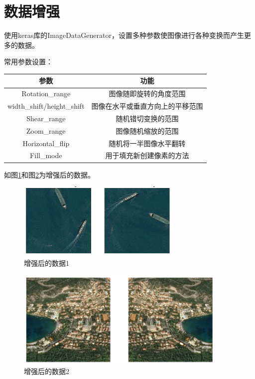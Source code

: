 \section{数据增强}

使用keras库的ImageDataGenerator，设置多种参数使图像进行各种变换而产生更多的数据。

常用参数设置：

\begin{longtable}[]{@{}cc@{}}
\toprule
参数 & 功能\tabularnewline
\midrule
\endhead
Rotation\_range & 图像随即旋转的角度范围\tabularnewline
width\_shift/height\_shift &
图像在水平或垂直方向上的平移范围\tabularnewline
Shear\_range & 随机错切变换的范围\tabularnewline
Zoom\_range & 图像随机缩放的范围\tabularnewline
Horizontal\_flip & 随机将一半图像水平翻转\tabularnewline
Fill\_mode & 用于填充新创建像素的方法\tabularnewline
\bottomrule
\end{longtable}

如图\ref{fig::model13}和图\ref{fig::model14}为增强后的数据。

\begin{figure}[htbp]
\centering
\includegraphics[width=0.8\linewidth]{body/model_pic/change1}
\caption{增强后的数据1}
\label{fig::model13}
\end{figure}

\begin{figure}[htbp]
\centering
\includegraphics[width=0.8\linewidth]{body/model_pic/change2}
\caption{增强后的数据2}
\label{fig::model14}
\end{figure}

